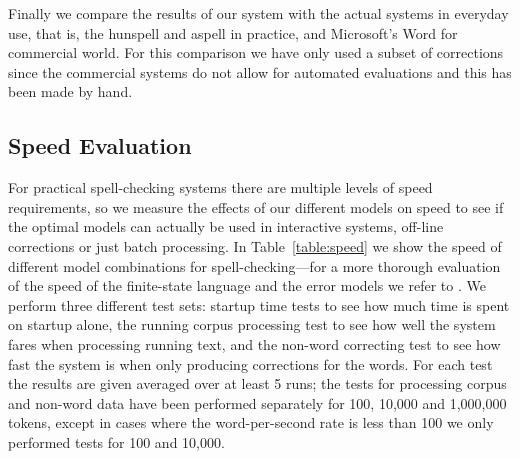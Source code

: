 \documentclass[a4paper,12pt]{article}
\begin{document}
%

Finally we compare the results of our system with the actual systems in
everyday use, that is, the hunspell and aspell in practice, and Microsoft's
Word for commercial world. For this comparison we have only used a subset of
corrections since the commercial systems do not allow for automated evaluations
and this has been made by hand. 

%


\subsection{Speed Evaluation}

For practical spell-checking systems there are multiple levels of speed
requirements, so we measure the effects of our different models on speed to see
if the optimal models can actually be used in interactive systems, off-line
corrections or just batch processing. In Table~\ref{table:speed} we show the
speed of different model combinations for spell-checking---for a more thorough
evaluation of the speed of the finite-state language and the error models we
refer to \cite{pirinen2012improving}. We perform three different test sets:
startup time tests to see how much time is spent on startup alone, the running
corpus processing test to see how well the system fares when processing running
text, and the non-word correcting test to see how fast the system is when only
producing corrections for the words. For each test the results are given
averaged over at least 5 runs; the tests for processing corpus and non-word
data have been performed separately for 100, 10,000 and 1,000,000 tokens,
except in cases where the word-per-second rate is less than 100 we only
performed tests for 100 and 10,000.
\end{document}
